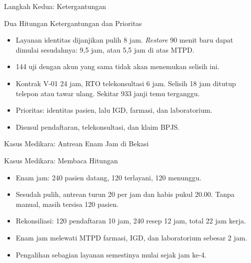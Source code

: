 \documentclass[aspectratio=169, table, 12pt]{beamer}
\begin{document}
\begin{frame}{{\Large Langkah Kedua: Ketergantungan}}
  \vspace{2pt}
  \begin{center}
    \resizebox{!}{0.76\textheight}{}
  \end{center}
\end{frame}

\begin{frame}{{\Large Dua Hitungan Ketergantungan dan Prioritas}}
  \vspace{6pt}
  \small
  \begin{itemize}
    \item Layanan identitas dijanjikan pulih 8 jam. \textit{Restore} 90 menit baru dapat dimulai
          sesudahnya: 9,5 jam, atau 5,5 jam di atas MTPD.
    \item 144 uji dengan akun yang sama tidak akan menemukan selisih ini.
    \item Kontrak V-01 24 jam, RTO telekonsultasi 6 jam. Selisih 18 jam ditutup telepon atau tawar
          ulang. Sekitar 933 janji temu terganggu.
    \item Prioritas: identitas pasien, lalu IGD, farmasi, dan laboratorium.
    \item Disusul pendaftaran, telekonsultasi, dan klaim BPJS.
  \end{itemize}
\end{frame}

\begin{frame}{{\Large Kasus Medikara: Antrean Enam Jam di Bekasi}}
  \vspace{2pt}
  \begin{center}
    \resizebox{!}{0.76\textheight}{}
  \end{center}
\end{frame}

\begin{frame}{{\Large Kasus Medikara: Membaca Hitungan}}
  \vspace{6pt}
  \small
  \begin{itemize}
    \item Enam jam: 240 pasien datang, 120 terlayani, 120 menunggu.
    \item Sesudah pulih, antrean turun 20 per jam dan habis pukul 20.00. Tanpa manual, masih tersisa
          120 pasien.
    \item Rekonsiliasi: 120 pendaftaran 10 jam, 240 resep 12 jam, total 22 jam kerja.
    \item Enam jam melewati MTPD farmasi, IGD, dan laboratorium sebesar 2 jam.
    \item Pengalihan sebagian layanan semestinya mulai sejak jam ke-4.
  \end{itemize}
\end{frame}
\end{document}
